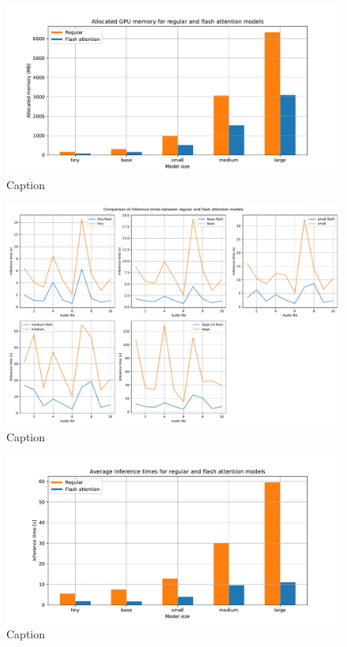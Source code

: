 \begin{figure}
    \centering
    \includegraphics[width=\textwidth]{figures/memory.pdf}
    \caption{Caption}
    \label{fig:whisper_memory}
\end{figure}

\begin{figure}
    \centering
    \includegraphics[width=\textwidth]{figures/inf_time.pdf}
    \caption{Caption}
    \label{fig:whisper_inf_time}
\end{figure}

\begin{figure}
    \centering
    \includegraphics[width=\textwidth]{figures/avg_inf_time.pdf}
    \caption{Caption}
    \label{fig:whisper_avg_inf_time}
\end{figure}